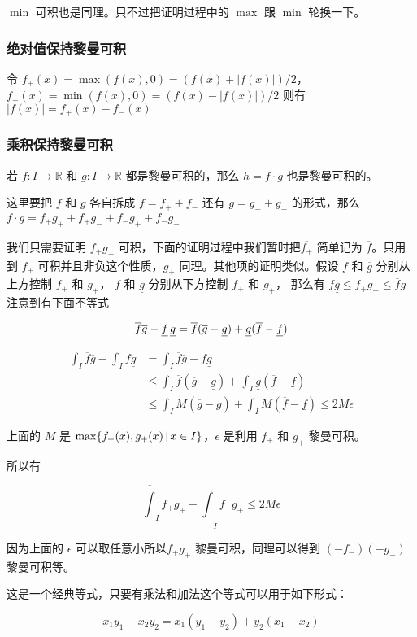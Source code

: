 $\min$ 可积也是同理。只不过把证明过程中的 $\max$ 跟 $\min$ 轮换一下。

\subsubsection{绝对值保持黎曼可积}

令 $f_{+}(x) = \max(f(x), 0) = (f(x) + \lvert f(x) \rvert) / 2$，$f_{-}(x) = \min(f(x), 0) = (f(x) - \lvert f(x) \rvert) / 2$
则有 $\lvert f(x) \rvert = f_{+}(x) - f_{-}(x)$

\subsubsection{乘积保持黎曼可积}



若 $f: I \to \mathbb{R}$ 和 $g: I \to \mathbb{R}$ 都是黎曼可积的，那么 $h = f \cdot g$ 也是黎曼可积的。

这里要把 $f$ 和 $g$ 各自拆成 $f = f_{+} + f_{-}$ 还有 $g = g_{+} + g_{-}$ 的形式，那么  $f \cdot g = f_{+}g_{+} + f_{+}g_{-} + f_{-}g_{+} +f_{-}g_{-} $

我们只需要证明 $f_{+}g_{+}$ 可积，下面的证明过程中我们暂时把$\overline{f_{+}}$ 简单记为 $\overline{f}$。只用到 $f_{+}$ 可积并且非负这个性质，$g_{+}$ 同理。其他项的证明类似。假设 $\overline{f}$ 和 $\overline{g}$ 分别从上方控制 $f_{+}$ 和 $g_{+}$， 
$\underline{f}$ 和 $\underline{g}$ 分别从下方控制 $f_{+}$ 和 $g_{+}$，
那么有 $ \underline{f} \underline{g} \le f_{+}g_{+} \le \overline{f} \overline{g}$ 注意到有下面不等式

\[
    \overline{f}\overline{g} - \underline{f} \, \underline{g} =  \overline{f}(\overline{g} - \underline{g}) + \underline{g}(\overline{f} - \underline{f}) \\
\]

\begin{align*}
    \int_{I}\overline{f}\overline{g} - \int_{I}\underline{f}\underline{g} &= \int_{I}\overline{f}\overline{g} - \underline{f}\underline{g} \\
    & \le \int_{I}\overline{f}(\overline{g} - \underline{g}) + \int_{I}\underline{g}(\overline{f} - \underline{f})  \\
    & \le \int_{I}M(\overline{g} - \underline{g}) + \int_{I}M(\overline{f} - \underline{f}) \le 2M\epsilon
\end{align*}

上面的 $M$ 是 $\max \{ f_{+}(x), g_{+}(x) \,\vert\, x \in I \}$，$\epsilon$ 是利用 $f_{+}$ 和 $g_{+}$ 黎曼可积。

所以有 

\[
    \overline{\int}_{I}f_{+}g_{+} - \underline{\int}_{I}f_{+}g_{+} \le 2 M \epsilon
\]

因为上面的 $\epsilon$ 可以取任意小所以$f_{+}g_{+}$ 黎曼可积，同理可以得到 $(-f_{-})(-g_{-})$ 黎曼可积等。

这是一个经典等式，只要有乘法和加法这个等式可以用于如下形式：

\[
    x_1y_1 - x_2y_2 = x_1(y_1 - y_2) + y_2(x_1 - x_2)
\]
